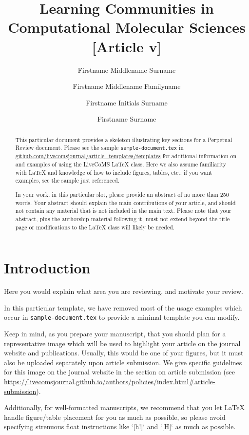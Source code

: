 \documentclass[9pt,review]{livecoms}
\title{Learning Communities in Computational Molecular Sciences [Article v\versionnumber]}
\author[1*]{Firstname Middlename Surname}
\author[1,2\authfn{1}\authfn{3}]{Firstname Middlename Familyname}
\author[2\authfn{1}\authfn{4}]{Firstname Initials Surname}
\author[2*]{Firstname Surname}
\affil[1]{Institution 1}
\affil[2]{Institution 2}
\begin{document}
\begin{frontmatter}
\maketitle

\begin{abstract}
This particular document provides a skeleton illustrating key sections for a Perpetual Review document.
Please see the sample \texttt{sample-document.tex} in \url{github.com/livecomsjournal/article_templates/templates} for additional information on and examples of using the LiveCoMS LaTeX class.
Here we also assume familiarity with LaTeX and knowledge of how to include figures, tables, etc.; if you want examples, see the sample just referenced.

In your work, in this particular slot, please provide an abstract of no more than 250 words.
Your abstract should explain the main contributions of your article, and should not contain any material that is not included in the main text.
Please note that your abstract, plus the authorship material following it, must not extend beyond the title page or modifications to the LaTeX class will likely be needed.
\end{abstract}

\end{frontmatter}


\section{Introduction}

Here you would explain what area you are reviewing, and motivate your review.

In this particular template, we have removed most of the usage examples which occur in \texttt{sample-document.tex} to provide a minimal template you can modify.

Keep in mind, as you prepare your manuscript, that you should plan for a representative image  which will be used to highlight your article on the journal website and publications. Usually, this would be one of your figures, but it must also be uploaded separately upon article submission. We give specific guidelines for this image on the journal website in the section on article submission (see \url{https://livecomsjournal.github.io/authors/policies/index.html#article-submission}).

Additionally, for well-formatted manuscripts, we recommend that you let LaTeX handle figure/table placement for you as much as possible, so please avoid specifying strenuous float instructions like `[h!]` and `[H]` as much as possible.
\end{document}
